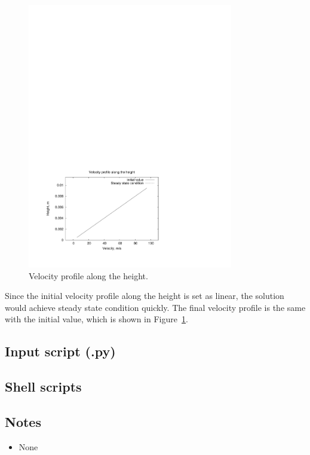 \begin{figure}[htbp]
\begin{center}
\includegraphics[width=0.8\textwidth,viewport=38 49 422 302,clip=true]{../2D/couette-flow/velocity.pdf}
\end{center}
\caption{Velocity profile along the height.}
   \label{couette-velocityp-fig}
\end{figure}

\medskip
Since the initial velocity profile along the height is set as linear, the solution would achieve steady state condition quickly.
The final velocity profile is the same with the initial value, which is shown in Figure~\ref{couette-velocityp-fig}.

\newpage
\subsection{Input script (.py)}
\topbar

\bottombar


\subsection{Shell scripts}
\label{couette-flow-2D-sh-files}
\topbar

\bottombar

\subsection{Notes}
\begin{itemize}
\item None
\end{itemize}


